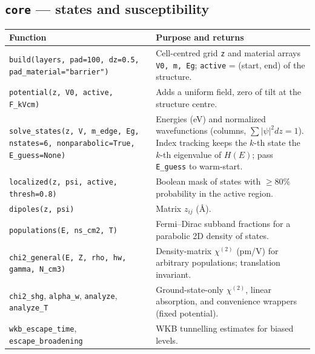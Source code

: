 \documentclass[11pt]{article}
\newcommand{\code}[1]{\texttt{#1}}
\begin{document}
\subsection{\code{core} --- states and susceptibility}
\begin{longtable}{@{}>{\raggedright\arraybackslash}p{}>{\raggedright\arraybackslash}p{}@{}}
\toprule
Function & Purpose and returns \\ \midrule
\code{build(layers, pad=100, dz=0.5, pad\_material="barrier")} & Cell-centred grid \code{z} and material arrays \code{V0, m, Eg}; \code{active} = (start, end) of the structure. \\
\code{potential(z, V0, active, F\_kVcm)} & Adds a uniform field, zero of tilt at the structure centre. \\
\code{solve\_states(z, V, m\_edge, Eg, nstates=6, nonparabolic=True, E\_guess=None)} & Energies (eV) and normalized wavefunctions (columns, $\sum|\psi|^2dz=1$). Index tracking keeps the $k$-th state the $k$-th eigenvalue of $H(E)$; pass \code{E\_guess} to warm-start. \\
\code{localized(z, psi, active, thresh=0.8)} & Boolean mask of states with $\geq$80\% probability in the active region. \\
\code{dipoles(z, psi)} & Matrix $z_{ij}$ (\AA). \\
\code{populations(E, ns\_cm2, T)} & Fermi--Dirac subband fractions for a parabolic 2D density of states. \\
\code{chi2\_general(E, Z, rho, hw, gamma, N\_cm3)} & Density-matrix $\chi^{(2)}$ (pm/V) for arbitrary populations; translation invariant. \\
\code{chi2\_shg}, \code{alpha\_w}, \code{analyze}, \code{analyze\_T} & Ground-state-only $\chi^{(2)}$, linear absorption, and convenience wrappers (fixed potential). \\
\code{wkb\_escape\_time}, \code{escape\_broadening} & WKB tunnelling estimates for biased levels. \\ \bottomrule
\end{longtable}
\end{document}
